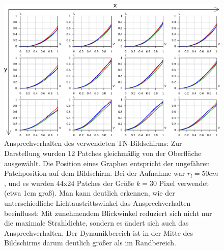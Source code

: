     \begin{figure}[h]
    \centering
    \includegraphics[width=\textwidth]{../graphics/kalibrierung/lenovo_response_multi_mod.svg}
    \caption[ Ansprechverhalten des Bildschirms]{
          Ansprechverhalten des verwendeten TN-Bildschirms:
          Zur Darstellung wurden 12 Patches gleichmäßig von der Oberfläche ausgewählt. Die Position eines Graphen entspricht der ungefähren Patchposition auf dem Bildschirm.
          Bei der Aufnahme war $r_l=50cm$, und es wurden 44x24 Patches der Größe $k=30$ Pixel verwendet (etwa 1cm groß).
          Man kann deutlich erkennen, wie der unterschiedliche Lichtaustrittswinkel das Ansprechverhalten beeinflusst:
          Mit zunehmendem Blickwinkel reduziert sich nicht nur die maximale Strahldichte, sondern es ändert sich auch das Ansprechverhalten.  
          Der Dynamikbereich ist in der Mitte des Bildschirms darum deutlich größer als im Randbereich.  
          }
    \label{fig:lenovo_responses}
   \end{figure}


